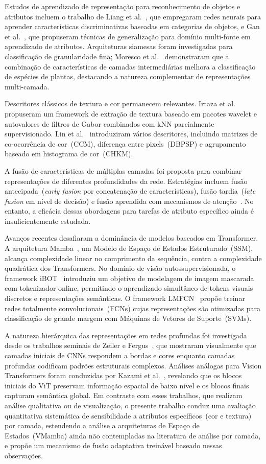 \documentclass[letterpaper, 10 pt, conference]{ieeeconf}
\begin{document}
Estudos de aprendizado de representação para reconhecimento de objetos e
atributos incluem o trabalho de Liang et al.~\cite{b10}, que empregaram
redes neurais para aprender características discriminativas baseadas em
categorias de objetos, e Gan et al.~\cite{b11}, que propuseram técnicas de
generalização para domínio multi-fonte em aprendizado de atributos.
Arquiteturas siamesas foram investigadas para classificação de granularidade
fina; Moresco et al.~\cite{b8} demonstraram que a combinação de
características de camadas intermediárias melhora a classificação de
espécies de plantas, destacando a natureza complementar de representações
multi-camada.

Descritores clássicos de textura e cor permanecem relevantes.
Irtaza et al.~\cite{b13} propuseram um framework de extração de textura
baseado em pacotes wavelet e autovalores de filtros de Gabor combinados com
kNN parcialmente supervisionado.
Lin et al.~\cite{b15} introduziram vários descritores, incluindo matrizes de
co-ocorrência de cor~(CCM), diferença entre pixels~(DBPSP) e agrupamento
baseado em histograma de cor~(CHKM).

A fusão de características de múltiplas camadas foi proposta para combinar
representações de diferentes profundidades da rede.
Estratégias incluem fusão antecipada~(\emph{early fusion} por
concatenação de características), fusão tardia~(\emph{late fusion} em
nível de decisão) e fusão aprendida com mecanismos de atenção~\cite{b26,b27}.
No entanto, a eficácia dessas abordagens para tarefas de atributo específico
ainda é insuficientemente estudada.

Avanços recentes desafiaram a dominância de modelos baseados em
Transformer.
A arquitetura Mamba~\cite{b16}, um Modelo de Espaço de Estados Estruturado~(SSM),
alcança complexidade linear no comprimento da sequência, contra a
complexidade quadrática dos Transformers.
No domínio de visão autossupervisionada, o framework
iBOT~\cite{b17} introduziu um objetivo de modelagem de imagem mascarada com
tokenizador online, permitindo o aprendizado simultâneo de tokens visuais
discretos e representações semânticas.
O framework LMFCN~\cite{b28} propõe treinar redes totalmente
convolucionais~(FCNs) cujas representações são otimizadas para
classificação de grande margem com Máquinas de Vetores de Suporte~(SVMs).

A natureza hierárquica das representações em redes profundas foi
investigada desde os trabalhos seminais de Zeiler e Fergus~\cite{bzeiler},
que mostraram visualmente que camadas iniciais de CNNs respondem a bordas
e cores enquanto camadas profundas codificam padrões estruturais complexos.
Análises análogas para Vision Transformers foram conduzidas por
Kazami et al.~\cite{bkazami}, revelando que os blocos iniciais do ViT
preservam informação espacial de baixo nível e os blocos finais capturam
semântica global.
Em contraste com esses trabalhos, que realizam análise qualitativa ou de
visualização, o presente trabalho conduz uma avaliação quantitativa
sistemática de sensibilidade a atributos específicos~(cor e textura) por
camada, estendendo a análise a arquiteturas de Espaço de Estados~(VMamba)
ainda não contempladas na literatura de análise por camada, e propõe um
mecanismo de fusão adaptativa treinável baseado nessas observações.
\end{document}
